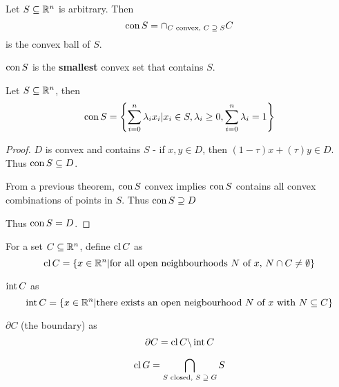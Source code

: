 \begin{defn}
  \label{defn:convexity:8}
  Let $S \subseteq \mathbb{R}^{n}$ is arbitrary. Then
  \begin{equation}
    \label{eq:21}
  \operatorname*{con} S = \cap_{\text{$C$ convex, $C \supseteq S$}} C  
  \end{equation}
  is the convex ball of $S$.
\end{defn}

\begin{remark}
  $\operatorname*{con} S$ is the \textbf{smallest} convex set that contains $S$.
\end{remark}

\begin{thm}
  \label{defn:convexity:9}
  Let $S \subseteq \mathbb{R}^{n}$, then
  \begin{equation}
    \label{eq:22}
    \operatorname*{con} S = \left\{ \sum_{i=0}^{n} \lambda_{i} x_{i} | x_{i} \in S,
    \lambda_{i} \geq 0, \sum_{i=0}^{n} \lambda_{i} = 1 \right\}
  \end{equation}
\end{thm}

\begin{proof}
  $D$ is convex and contains $S$ - if $x, y \in D$, then $(1-\tau)x +
  (\tau)y \in D$.  Thus $\operatorname*{con} S \subseteq D$.

  From a previous theorem, $\operatorname*{con} S$ convex implies $\operatorname*{con} S$ contains all
  convex combinations of points in $S$.  Thus $\operatorname*{con} S \supseteq D$

  Thus $\operatorname*{con} S = D$.
\end{proof}

\begin{defn}
  \label{defn:convexity:10}
  For a set $C \subseteq \mathbb{R}^{n}$, define $\operatorname*{cl} C$ as
  \begin{equation}
    \label{eq:23}
    \operatorname*{cl} C = \{ x \in \mathbb{R}^{n} | \text{for all open neighbourhoods $N$ of
      $x$, $N \cap C \neq \emptyset$} \}
  \end{equation}

  $\operatorname*{int} C$ as
  \begin{equation}
    \label{eq:24}
    \operatorname*{int} C = \{ x \in \mathbb{R}^{n} | \text{there exists an open neigbourhood $N$ of
      $x$ with $N \subseteq C$} \}
  \end{equation}

  $\partial C$ (the boundary) as
  \begin{equation}
    \label{eq:25}
    \partial C = \operatorname*{cl} C \backslash \operatorname*{int} C
  \end{equation}
\end{defn}

\begin{remark}
  \begin{equation}
    \label{eq:26}
    \operatorname*{cl} G = \bigcap_{\text{$S$ closed, $S \supseteq G$}} S
  \end{equation}
\end{remark}

